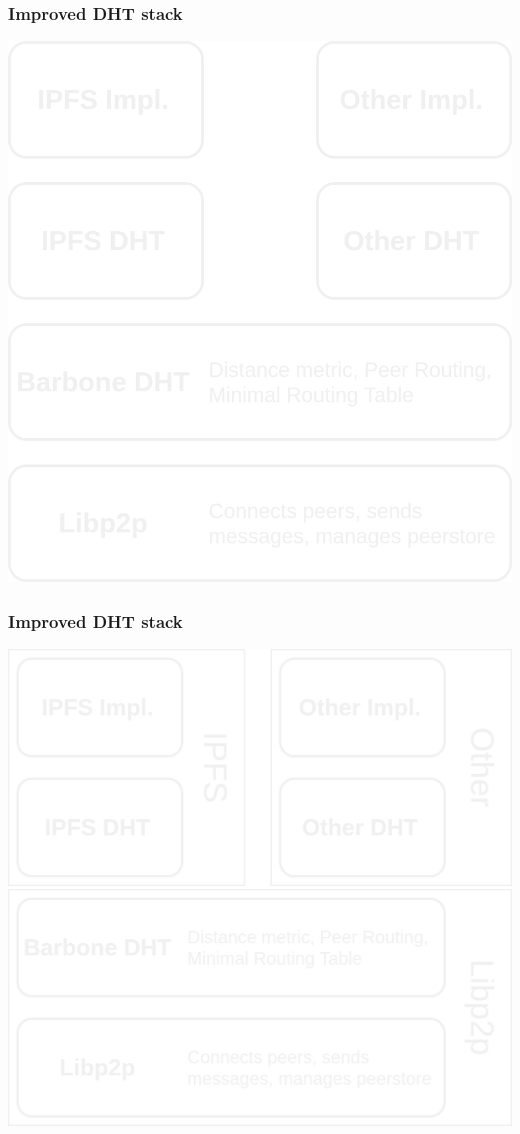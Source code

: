 \documentclass{../pl-slide}
\begin{document}
\begin{frame}
\frametitle{Improved DHT stack}
\includegraphics[scale=.18]{resources/improved-dht-mult-stack.png}
\end{frame}
\begin{frame}
\frametitle{Improved DHT stack}
\includegraphics[scale=.18]{resources/improved-dht-mult-stack-cat.png}
\end{frame}
\end{document}
